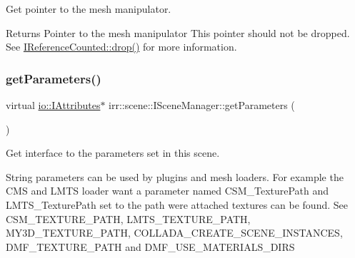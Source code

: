 Get pointer to the mesh manipulator. 

\begin{DoxyReturn}{Returns}
Pointer to the mesh manipulator This pointer should not be dropped. See \hyperlink{classirr_1_1IReferenceCounted_a03856a09355b89d178090c4a5f738543}{I\+Reference\+Counted\+::drop()} for more information. 
\end{DoxyReturn}
\mbox{\label{classirr_1_1scene_1_1ISceneManager_a4dba8ee7f48fdf6ede2c3f4b5fabcad3}} 
\subsubsection{\texorpdfstring{get\+Parameters()}{getParameters()}\hspace{0.1cm}{\footnotesize\ttfamily [1/2]}}
{\footnotesize\ttfamily virtual \hyperlink{classirr_1_1io_1_1IAttributes}{io\+::\+I\+Attributes}$\ast$ irr\+::scene\+::\+I\+Scene\+Manager\+::get\+Parameters (\begin{DoxyParamCaption}{ }\end{DoxyParamCaption})\hspace{0.3cm}{\ttfamily [pure virtual]}}



Get interface to the parameters set in this scene. 

String parameters can be used by plugins and mesh loaders. For example the C\+MS and L\+M\+TS loader want a parameter named \textquotesingle{}C\+S\+M\+\_\+\+Texture\+Path\textquotesingle{} and \textquotesingle{}L\+M\+T\+S\+\_\+\+Texture\+Path\textquotesingle{} set to the path were attached textures can be found. See C\+S\+M\+\_\+\+T\+E\+X\+T\+U\+R\+E\+\_\+\+P\+A\+TH, L\+M\+T\+S\+\_\+\+T\+E\+X\+T\+U\+R\+E\+\_\+\+P\+A\+TH, M\+Y3\+D\+\_\+\+T\+E\+X\+T\+U\+R\+E\+\_\+\+P\+A\+TH, C\+O\+L\+L\+A\+D\+A\+\_\+\+C\+R\+E\+A\+T\+E\+\_\+\+S\+C\+E\+N\+E\+\_\+\+I\+N\+S\+T\+A\+N\+C\+ES, D\+M\+F\+\_\+\+T\+E\+X\+T\+U\+R\+E\+\_\+\+P\+A\+TH and D\+M\+F\+\_\+\+U\+S\+E\+\_\+\+M\+A\+T\+E\+R\+I\+A\+L\+S\+\_\+\+D\+I\+RS \mbox{\label{classirr_1_1scene_1_1ISceneManager_a4dba8ee7f48fdf6ede2c3f4b5fabcad3}} 
